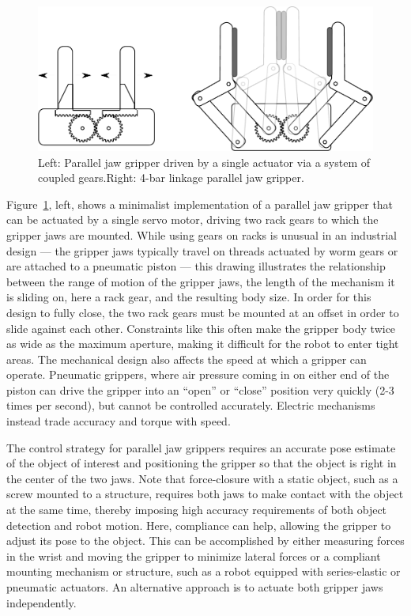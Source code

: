 \begin{figure}
\centering
\includegraphics[width=\columnwidth]{figs/gripper-2-dof}
\caption{Left: Parallel jaw gripper driven by a single actuator via a system of coupled gears.Right: 4-bar linkage parallel jaw gripper. \label{fig:paralleljaw}}
\end{figure}

Figure~\ref{fig:paralleljaw}, left, shows a minimalist implementation of a parallel jaw gripper that can be actuated by a single servo motor, driving two rack gears to which the gripper jaws are mounted. While using gears on racks is unusual in an industrial design --- the gripper jaws typically travel on threads actuated by worm gears or are attached to a pneumatic piston --- this drawing illustrates the relationship between the range of motion of the gripper jaws, the length of the mechanism it is sliding on, here a rack gear, and the resulting body size. In order for this design to fully close, the two rack gears must be mounted at an offset in order to slide against each other. Constraints like this often make the gripper body twice as wide as the maximum aperture, making it difficult for the robot to enter tight areas. The mechanical design also affects the speed at which a gripper can operate. Pneumatic grippers, where air pressure coming in on either end of the piston can drive the gripper into an ``open'' or ``close'' position very quickly (2-3 times per second), but cannot be controlled accurately. Electric mechanisms instead trade accuracy and torque with speed. 

The control strategy for parallel jaw grippers requires an accurate pose estimate of the object of interest and positioning the gripper so that the object is right in the center of the two jaws. Note that force-closure with a static object, such as a screw mounted to a structure, requires both jaws to make contact with the object at the same time, thereby imposing high accuracy requirements of both object detection and robot motion. Here, compliance can help, allowing the gripper to adjust its pose to the object. This can be accomplished by either measuring forces in the wrist and moving the gripper to minimize lateral forces or a compliant mounting mechanism or structure, such as a robot equipped with series-elastic or pneumatic actuators. An alternative approach is to actuate both gripper jaws independently.


